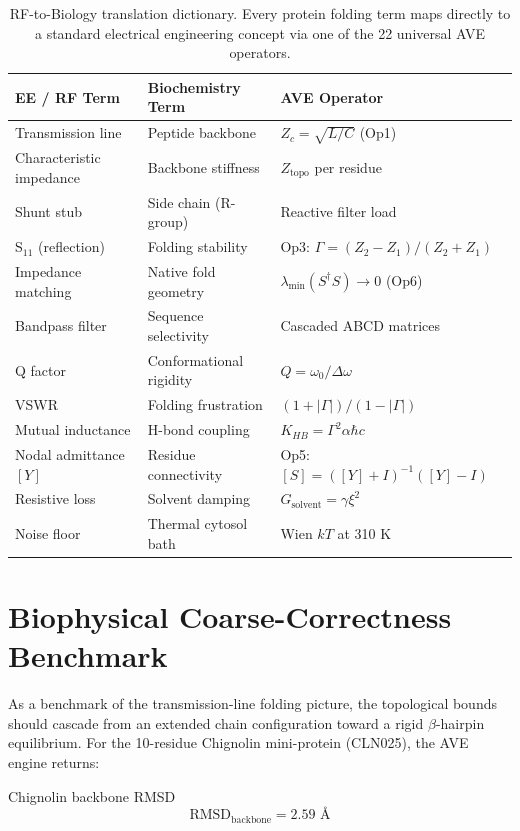 \begin{table}[h]
\centering
\renewcommand{\arraystretch}{1.3}
\begin{tabularx}{\textwidth}{@{}llX@{}}
\toprule
\textbf{EE / RF Term} & \textbf{Biochemistry Term} & \textbf{AVE Operator} \\
\midrule
Transmission line      & Peptide backbone           & $Z_c = \sqrt{L/C}$ (Op1) \\
Characteristic impedance & Backbone stiffness       & $Z_\text{topo}$ per residue \\
Shunt stub             & Side chain (R-group)       & Reactive filter load \\
S$_{11}$ (reflection)  & Folding stability          & Op3: $\Gamma = (Z_2-Z_1)/(Z_2+Z_1)$ \\
Impedance matching     & Native fold geometry       & $\lambda_\text{min}(S^\dagger S) \to 0$ (Op6) \\
Bandpass filter        & Sequence selectivity       & Cascaded ABCD matrices \\
Q factor               & Conformational rigidity    & $Q = \omega_0 / \Delta\omega$ \\
VSWR                   & Folding frustration        & $(1+|\Gamma|)/(1-|\Gamma|)$ \\
Mutual inductance      & H-bond coupling            & $K_{HB} = \Gamma^2 \alpha\hbar c$ \\
Nodal admittance $[Y]$ & Residue connectivity       & Op5: $[S] = ([Y]+I)^{-1}([Y]-I)$ \\
Resistive loss         & Solvent damping            & $G_\text{solvent} = \gamma \xi^2$ \\
Noise floor            & Thermal cytosol bath       & Wien $kT$ at 310 K \\
\bottomrule
\end{tabularx}
\caption{RF-to-Biology translation dictionary. Every protein folding term maps directly to a standard electrical engineering concept via one of the 22 universal AVE operators.}
\label{tab:rf_bio_dict}
\end{table}

\section{Biophysical Coarse-Correctness Benchmark}

As a benchmark of the transmission-line folding picture, the topological bounds should cascade from an extended chain configuration toward a rigid $\beta$-hairpin equilibrium. For the 10-residue Chignolin mini-protein (CLN025), the AVE engine returns:
\begin{resultbox}{Chignolin backbone RMSD}
\begin{equation}
    \text{RMSD}_{\text{backbone}} = 2.59 \text{ \AA}
\end{equation}
\end{resultbox}

